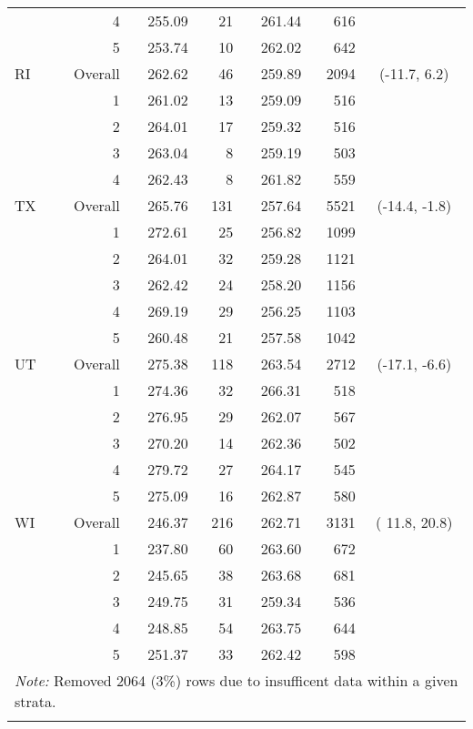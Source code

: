 \begin{longtable}{lrrr@{\extracolsep{.25cm}}rrc}
   & 4 & 255.09 &  21 & 261.44 & 616 &  \\ 
   & 5 & 253.74 &  10 & 262.02 & 642 &  \\ 
   \hline
RI & Overall & 262.62 &  46 & 259.89 & 2094 & (-11.7,   6.2) \\ 
   & 1 & 261.02 &  13 & 259.09 & 516 &  \\ 
   & 2 & 264.01 &  17 & 259.32 & 516 &  \\ 
   & 3 & 263.04 &   8 & 259.19 & 503 &  \\ 
   & 4 & 262.43 &   8 & 261.82 & 559 &  \\ 
   \hline
TX & Overall & 265.76 & 131 & 257.64 & 5521 & (-14.4,  -1.8) \\ 
   & 1 & 272.61 &  25 & 256.82 & 1099 &  \\ 
   & 2 & 264.01 &  32 & 259.28 & 1121 &  \\ 
   & 3 & 262.42 &  24 & 258.20 & 1156 &  \\ 
   & 4 & 269.19 &  29 & 256.25 & 1103 &  \\ 
   & 5 & 260.48 &  21 & 257.58 & 1042 &  \\ 
   \hline
UT & Overall & 275.38 & 118 & 263.54 & 2712 & (-17.1,  -6.6) \\ 
   & 1 & 274.36 &  32 & 266.31 & 518 &  \\ 
   & 2 & 276.95 &  29 & 262.07 & 567 &  \\ 
   & 3 & 270.20 &  14 & 262.36 & 502 &  \\ 
   & 4 & 279.72 &  27 & 264.17 & 545 &  \\ 
   & 5 & 275.09 &  16 & 262.87 & 580 &  \\ 
   \hline
WI & Overall & 246.37 & 216 & 262.71 & 3131 & ( 11.8,  20.8) \\ 
   & 1 & 237.80 &  60 & 263.60 & 672 &  \\ 
   & 2 & 245.65 &  38 & 263.68 & 681 &  \\ 
   & 3 & 249.75 &  31 & 259.34 & 536 &  \\ 
   & 4 & 248.85 &  54 & 263.75 & 644 &  \\ 
   & 5 & 251.37 &  33 & 262.42 & 598 &  \\ 
   \hline \multicolumn{7}{l}{\textit{Note:} Removed 2064 (3\%) rows due to insufficent data within a given strata.} \\\hline
\label{g8read-mlpsa-lrAIC}
\end{longtable}
